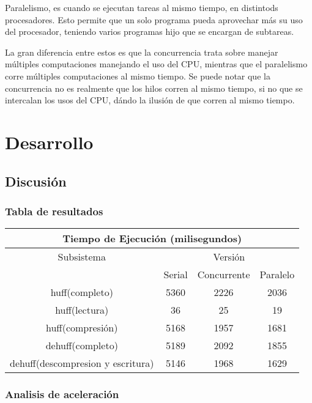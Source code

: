 \documentclass{report}
\begin{document}
Paralelismo, es cuando se ejecutan tareas al mismo tiempo, en distintods procesadores. 
Esto permite que un solo programa pueda aprovechar más su uso del procesador, teniendo varios programas hijo que se encargan de subtareas.

La gran diferencia entre estos es que la concurrencia trata sobre manejar múltiples computaciones manejando el uso del CPU, mientras que el paralelismo corre múltiples computaciones al mismo tiempo.
Se puede notar que la concurrencia no es realmente que los hilos corren al mismo tiempo, si no que se intercalan los usos del CPU, dándo la ilusión de que corren al mismo tiempo.



\chapter {Desarrollo}
\section{Discusión}
\subsection{Tabla de resultados}
\begin{center}
	\begin{tabular}{|c|c|c|c|}		
		
\hline
\multicolumn{4}{|c|}{Tiempo de Ejecución (milisegundos)} \\
\hline
 Subsistema& \multicolumn{3}{|c|}{Versión} \\
 \hline
 & Serial & Concurrente & Paralelo\\
 \hline
huff(completo) & 5360& 2226 & 2036\\
 \hline
huff(lectura) &  36 & 25 & 19\\
 \hline
 huff(compresión) &  5168 & 1957 & 1681\\
 \hline
 dehuff(completo) & 5189 & 2092 & 1855\\
 \hline
 dehuff(descompresion y escritura) & 5146 & 1968 & 1629\\
 \hline
 
	\end{tabular}
\end{center}

\subsection{Analisis de aceleración}
\end{document}
